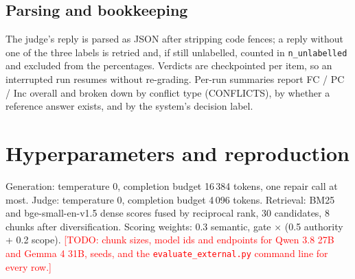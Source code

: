 \documentclass[11pt]{article}
\newcommand{\todo}[1]{\textcolor{red}{[TODO: #1]}}
\newcommand{\genB}{Qwen 3.8 27B}
\newcommand{\genC}{Gemma 4 31B}
\begin{document}
\subsection{Parsing and bookkeeping}
The judge's reply is parsed as JSON after stripping code fences; a reply
without one of the three labels is retried and, if still unlabelled, counted
in \texttt{n\_unlabelled} and excluded from the percentages. Verdicts are
checkpointed per item, so an interrupted run resumes without re-grading.
Per-run summaries report FC / PC / Inc overall and broken down by conflict
type (CONFLICTS), by whether a reference answer exists, and by the system's
decision label.
\section{Hyperparameters and reproduction}
Generation: temperature 0, completion budget 16\,384 tokens, one repair call
at most. Judge: temperature 0, completion budget 4\,096 tokens. Retrieval:
BM25 and bge-small-en-v1.5 dense scores fused by reciprocal rank, 30
candidates, 8 chunks after diversification. Scoring weights: 0.3 semantic,
gate $\times$ (0.5 authority + 0.2 scope).
\todo{chunk sizes, model ids and endpoints for \genB{} and \genC{}, seeds,
and the \texttt{evaluate\_external.py} command line for every row.}
\end{document}
